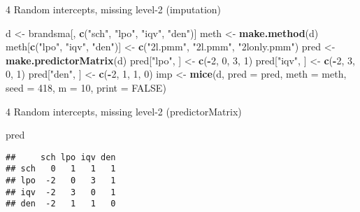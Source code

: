 \documentclass[ignorenonframetext,aspectratio=43]{beamer}
\newenvironment{Shaded}{\begin{snugshade}}{\end{snugshade}}
\newcommand{\KeywordTok}[1]{\textcolor[rgb]{0.13,0.29,0.53}{\textbf{#1}}}
\newcommand{\DataTypeTok}[1]{\textcolor[rgb]{0.13,0.29,0.53}{#1}}
\newcommand{\DecValTok}[1]{\textcolor[rgb]{0.00,0.00,0.81}{#1}}
\newcommand{\StringTok}[1]{\textcolor[rgb]{0.31,0.60,0.02}{#1}}
\newcommand{\OtherTok}[1]{\textcolor[rgb]{0.56,0.35,0.01}{#1}}
\newcommand{\OperatorTok}[1]{\textcolor[rgb]{0.81,0.36,0.00}{\textbf{#1}}}
\newcommand{\NormalTok}[1]{#1}
\begin{document}
\begin{frame}[fragile]{4 Random intercepts, missing level-2
(imputation)}

\begin{Shaded}
\begin{Highlighting}[]
\NormalTok{d <-}\StringTok{ }\NormalTok{brandsma[, }\KeywordTok{c}\NormalTok{(}\StringTok{"sch"}\NormalTok{, }\StringTok{"lpo"}\NormalTok{, }\StringTok{"iqv"}\NormalTok{, }\StringTok{"den"}\NormalTok{)]}
\NormalTok{meth <-}\StringTok{ }\KeywordTok{make.method}\NormalTok{(d)}
\NormalTok{meth[}\KeywordTok{c}\NormalTok{(}\StringTok{"lpo"}\NormalTok{, }\StringTok{"iqv"}\NormalTok{, }\StringTok{"den"}\NormalTok{)] <-}\StringTok{ }\KeywordTok{c}\NormalTok{(}\StringTok{"2l.pmm"}\NormalTok{, }\StringTok{"2l.pmm"}\NormalTok{,}
                                  \StringTok{"2lonly.pmm"}\NormalTok{)}
\NormalTok{pred <-}\StringTok{ }\KeywordTok{make.predictorMatrix}\NormalTok{(d)}
\NormalTok{pred[}\StringTok{"lpo"}\NormalTok{, ] <-}\StringTok{ }\KeywordTok{c}\NormalTok{(}\OperatorTok{-}\DecValTok{2}\NormalTok{, }\DecValTok{0}\NormalTok{, }\DecValTok{3}\NormalTok{, }\DecValTok{1}\NormalTok{)}
\NormalTok{pred[}\StringTok{"iqv"}\NormalTok{, ] <-}\StringTok{ }\KeywordTok{c}\NormalTok{(}\OperatorTok{-}\DecValTok{2}\NormalTok{, }\DecValTok{3}\NormalTok{, }\DecValTok{0}\NormalTok{, }\DecValTok{1}\NormalTok{)}
\NormalTok{pred[}\StringTok{"den"}\NormalTok{, ] <-}\StringTok{ }\KeywordTok{c}\NormalTok{(}\OperatorTok{-}\DecValTok{2}\NormalTok{, }\DecValTok{1}\NormalTok{, }\DecValTok{1}\NormalTok{, }\DecValTok{0}\NormalTok{)}
\NormalTok{imp <-}\StringTok{ }\KeywordTok{mice}\NormalTok{(d, }\DataTypeTok{pred =}\NormalTok{ pred, }\DataTypeTok{meth =}\NormalTok{ meth, }\DataTypeTok{seed =} \DecValTok{418}\NormalTok{,}
            \DataTypeTok{m =} \DecValTok{10}\NormalTok{, }\DataTypeTok{print =} \OtherTok{FALSE}\NormalTok{)}
\end{Highlighting}
\end{Shaded}

\end{frame}

\begin{frame}[fragile]{4 Random intercepts, missing level-2
(predictorMatrix)}

\begin{Shaded}
\begin{Highlighting}[]
\NormalTok{pred}
\end{Highlighting}
\end{Shaded}

\begin{verbatim}
##     sch lpo iqv den
## sch   0   1   1   1
## lpo  -2   0   3   1
## iqv  -2   3   0   1
## den  -2   1   1   0
\end{verbatim}

\end{frame}
\end{document}
